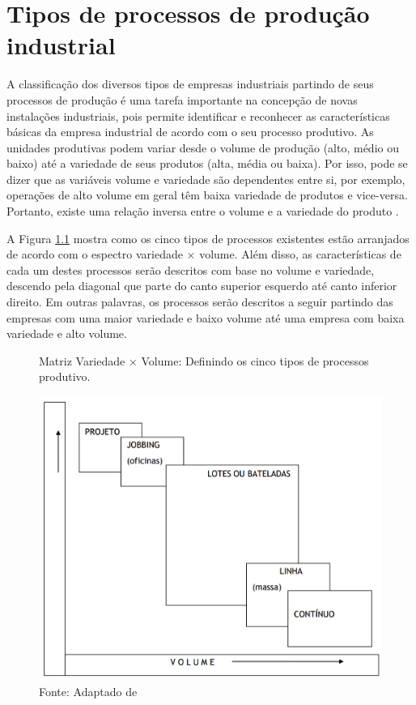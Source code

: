 \chapter{Tipos de processos de produção industrial}
\label{chap:tipos_de_processo_de_producao}

A classificação dos diversos tipos de empresas industriais partindo de seus processos de produção é uma tarefa importante na concepção de novas instalações industriais, pois permite identificar e reconhecer as características básicas da empresa industrial de acordo com o seu processo produtivo. As unidades produtivas podem variar desde o volume de produção (alto, médio ou baixo) até a variedade de seus produtos (alta, média ou baixa). Por isso, pode se dizer que as variáveis volume e variedade são dependentes entre si, por exemplo, operações de alto volume em geral têm baixa variedade de produtos e vice-versa. Portanto, existe uma relação inversa entre o volume e a variedade do produto \cite{slack2009administracao}.

A Figura \ref{fig:tipos_de_processo_de_producao} mostra como os cinco tipos de processos existentes estão arranjados de acordo com o espectro variedade $\times$ volume. Além disso, as características de cada um destes processos serão descritos com base no volume e variedade, descendo pela diagonal que parte do canto superior esquerdo até canto inferior direito. Em outras palavras, os processos serão descritos a seguir partindo das empresas com uma maior variedade e baixo volume até uma empresa com baixa variedade e alto volume.

\begin{figure}[H]
  \caption{Matriz Variedade $\times$ Volume: Definindo os cinco tipos de processos produtivo.} %
  \includegraphics[width=1\textwidth]{images/tiposdeprocesso.png}
  \caption*{Fonte: Adaptado de \cite{slack2009administracao}}
  \label{fig:tipos_de_processo_de_producao}
\end{figure}

